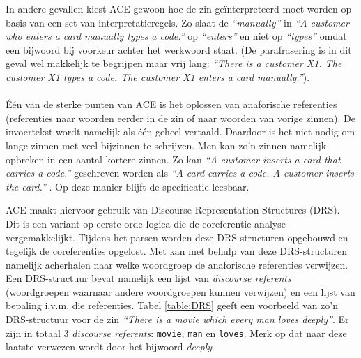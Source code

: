 \documentclass[]{article}
\theoremstyle{definition}
\newcommand{\example}[1]{\textit{``#1''}}
\begin{document}
In andere gevallen kiest ACE gewoon hoe de zin geïnterpreteerd moet worden op basis van een set van interpretatieregels. Zo slaat de \example{manually} in \example{A customer who {enters a card manually} types a code.} \cite{ACEConstructionRules} op \example{enters} en niet op \example{types} omdat een bijwoord bij voorkeur achter het werkwoord staat. (De parafrasering is in dit geval wel makkelijk te begrijpen maar vrij lang: \example{There is a customer X1. The customer X1 types a code. The customer X1 enters a card manually.}).

\paragraph{} Één van de sterke punten van ACE is het oplossen van anaforische referenties (referenties naar woorden eerder in de zin of naar woorden van vorige zinnen). De invoertekst wordt namelijk als één geheel vertaald. Daardoor is het niet nodig om lange zinnen met veel bijzinnen te schrijven. Men kan zo'n zinnen namelijk opbreken in een aantal kortere zinnen. Zo kan \example{A customer inserts a card that carries a code.} geschreven worden als \example{A card carries a code. A customer inserts the card.} \cite{Fuchs2008}. Op deze manier blijft de specificatie leesbaar.

ACE maakt hiervoor gebruik van Discourse Representation Structures (DRS). Dit is een variant op eerste-orde-logica die de coreferentie-analyse vergemakkelijkt. Tijdens het parsen worden deze DRS-structuren opgebouwd en tegelijk de coreferenties opgelost. Met kan met behulp van deze DRS-structuren namelijk acherhalen naar welke woordgroep de anaforische referenties verwijzen. Een DRS-structuur bevat namelijk een lijst van \textit{discourse referents} (woordgroepen waarnaar andere woordgroepen kunnen verwijzen) en een lijst van bepaling i.v.m. die referenties. Tabel \ref{table:DRS} geeft een voorbeeld van zo'n DRS-structuur voor de zin \example{There is a movie which every man loves deeply}. Er zijn in totaal 3 \textit{discourse referents}: \texttt{movie}, \texttt{man} en \texttt{loves}. Merk op dat naar deze laatste verwezen wordt door het bijwoord \textit{deeply}.
\end{document}
